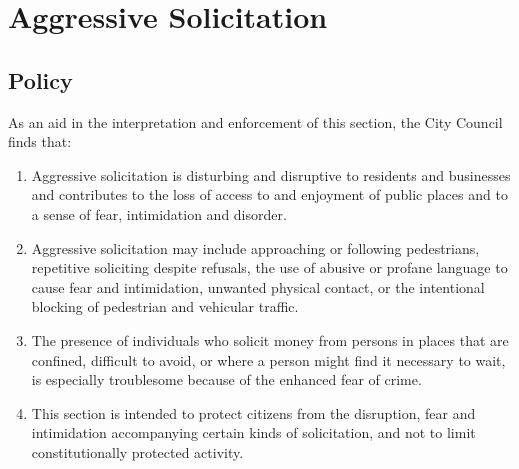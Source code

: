 \section{Aggressive Solicitation}
\subsection{Policy}
As an aid in the interpretation and enforcement of this section, the City Council finds that:
\begin{enumerate}[{\indent}1)]
    \item Aggressive solicitation is disturbing and disruptive to residents and businesses and contributes to the loss of access to and enjoyment of public places and to a sense of fear, intimidation and disorder.
    \item Aggressive solicitation may include approaching or following pedestrians, repetitive soliciting despite refusals, the use of abusive or profane language to cause fear and intimidation, unwanted physical contact, or the intentional blocking of pedestrian and vehicular traffic.
    \item The presence of individuals who solicit money from persons in places that are confined, difficult to avoid, or where a person might find it necessary to wait, is especially troublesome because of the enhanced fear of crime.
    \item This section is intended to protect citizens from the disruption, fear and intimidation accompanying certain kinds of solicitation, and not to limit constitutionally protected activity.\end{enumerate}
